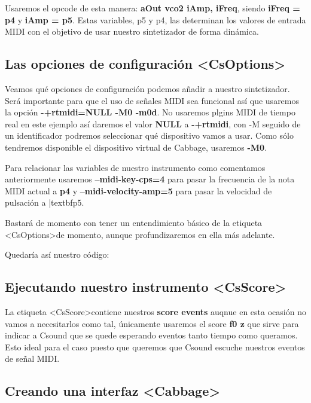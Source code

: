 Usaremos el opcode de esta manera: \textbf{aOut vco2 iAmp, iFreq}, siendo \textbf{iFreq = p4} y \textbf{iAmp = p5}. Estas variables, p5 y p4, las determinan los valores de entrada MIDI con el objetivo de usar nuestro sintetizador de forma dinámica.

\subsection{Las opciones de configuración \textless CsOptions\textgreater}\label{sec:optSinte}

Veamos qué opciones de configuración podemos añadir a nuestro sintetizador. Será importante para que el uso de señales MIDI sea funcional así que usaremos la opción \textbf{-+rtmidi=NULL -M0 -m0d}. No usaremos plgins MIDI de tiempo real en este ejemplo así daremos el valor \textbf{NULL} a \textbf{-+rtmidi}, con -M seguido de un identificador podremos seleccionar qué dispositivo vamos a usar. Como sólo tendremos disponible el dispositivo virtual de Cabbage, usaremos \textbf{-M0}. 

Para relacionar las variables de nuestro instrumento como comentamos anteriormente usaremos \textbf{--midi-key-cps=4} para pasar la frecuencia de la nota MIDI actual a \textbf{p4} y \textbf{--midi-velocity-amp=5} para pasar la velocidad de pulsación a |textbf{p5}.

Bastará de momento con tener un entendimiento básico de la etiqueta \textless CsOptions\textgreater de momento, aunque profundizaremos en ella más adelante.

Quedaría así nuestro código:


\subsection{Ejecutando nuestro instrumento \textless CsScore\textgreater}\label{sec:scoreSinte}

La etiqueta \textless CsScore\textgreater contiene nuestros \textbf{score events} auqnue en esta ocasión no vamos a necesitarlos como tal, únicamente usaremos el score \textbf{f0 z} que sirve para indicar a Csound que se quede esperando eventos tanto tiempo como queramos. Esto ideal para el caso puesto que queremos que Csound escuche nuestros eventos de señal MIDI.

\subsection{Creando una interfaz \textless Cabbage\textgreater}\label{sec:UISinte}


